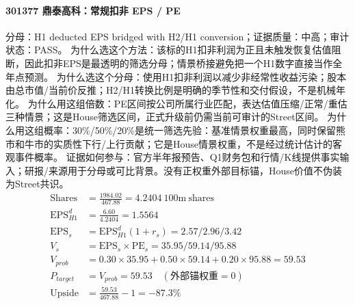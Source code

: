 \paragraph{301377 鼎泰高科：常规扣非 EPS / PE}
分母：H1 deducted EPS bridged with H2/H1 conversion；证据质量：中高；审计状态：PASS。
为什么选这个方法：该标的H1扣非利润为正且未触发恢复估值阻断，因此扣非EPS是最透明的筛选分母；情景桥接避免把一个H1数字直接当作全年点预测。
为什么选这个分母：使用H1扣非利润以减少非经常性收益污染；股本由总市值/当前价反推；H2/H1转换比例是明确的季节性和交付假设，不是机械年化。
为什么用这组倍数：PE区间按公司所属行业匹配，表达估值压缩/正常/重估三种情景；这是House筛选区间，正式升级前仍需当前可审计的Street区间。
为什么用这组概率：30\%/50\%/20\%是统一筛选先验：基准情景权重最高，同时保留熊市和牛市的实质性下行/上行贡献；它是House情景权重，不是经过统计估计的客观事件概率。
证据如何参与：官方半年报预告、Q1财务包和行情/K线提供事实输入；研报/来源用于分母或可比背景。没有正权重外部目标锚，House价值不伪装为Street共识。
\begin{align*}
\mathrm{Shares} &= \frac{1984.02}{467.88}=4.2404\ \mathrm{100m\ shares}\\
\mathrm{EPS}_{H1}^d &= \frac{6.60}{4.2404}=1.5564\\
\mathrm{EPS}_s &= \mathrm{EPS}_{H1}^d(1+r_s)=2.57/2.96/3.42\\
V_s &= \mathrm{EPS}_s\times \mathrm{PE}_s=35.95/59.14/95.88\\
V_{prob} &= 0.30\times 35.95+0.50\times 59.14+0.20\times 95.88=59.53\\
P_{target} &= V_{prob}=59.53\quad(\text{外部锚权重}=0)\\
\mathrm{Upside} &= \frac{59.53}{467.88}-1=-87.3\%\\
\end{align*}


